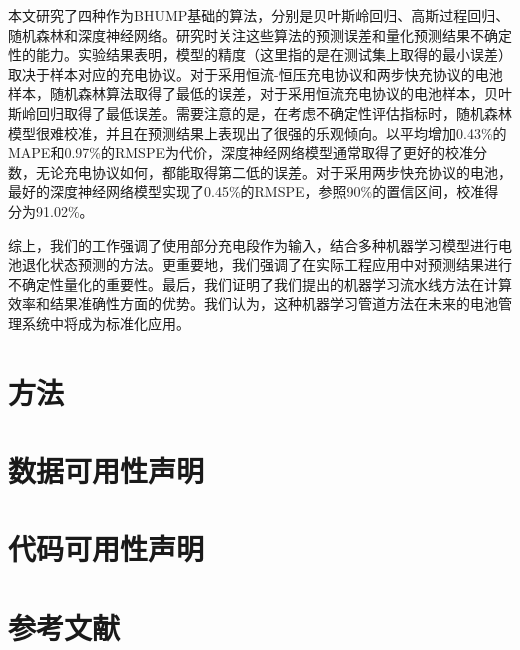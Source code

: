 \documentclass{article}
\begin{document}
本文研究了四种作为BHUMP基础的算法，分别是贝叶斯岭回归、高斯过程回归、随机森林和深度神经网络。研究时关注这些算法的预测误差和量化预测结果不确定性的能力。实验结果表明，模型的精度（这里指的是在测试集上取得的最小误差）取决于样本对应的充电协议。对于采用恒流-恒压充电协议和两步快充协议的电池样本，随机森林算法取得了最低的误差，对于采用恒流充电协议的电池样本，贝叶斯岭回归取得了最低误差。需要注意的是，在考虑不确定性评估指标时，随机森林模型很难校准，并且在预测结果上表现出了很强的乐观倾向。以平均增加0.43\%的MAPE和0.97\%的RMSPE为代价，深度神经网络模型通常取得了更好的校准分数，无论充电协议如何，都能取得第二低的误差。对于采用两步快充协议的电池，最好的深度神经网络模型实现了0.45\%的RMSPE，参照90\%的置信区间，校准得分为91.02\%。

综上，我们的工作强调了使用部分充电段作为输入，结合多种机器学习模型进行电池退化状态预测的方法。更重要地，我们强调了在实际工程应用中对预测结果进行不确定性量化的重要性。最后，我们证明了我们提出的机器学习流水线方法在计算效率和结果准确性方面的优势。我们认为，这种机器学习管道方法在未来的电池管理系统中将成为标准化应用。

\section{方法}

\section{数据可用性声明}

\section{代码可用性声明}

\section{参考文献}
\end{document}
